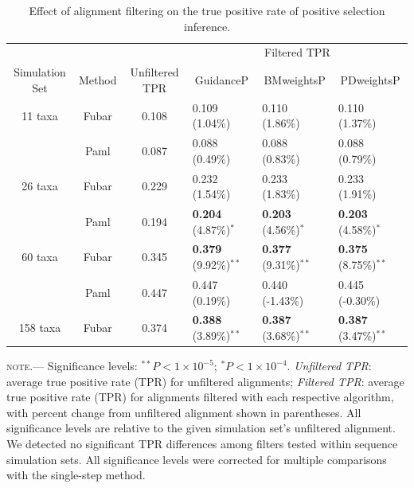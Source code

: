 \documentclass[10pt]{article}
\begin{document}
\begin{table}
\caption {\label{tab:casemodel} Effect of alignment filtering on the true positive rate of positive selection inference.}
\begin{tabular}{c c c l l l}
\hline\noalign{\smallskip}
& & & \multicolumn{3}{c}{Filtered TPR} \\
\cline{4-6}\noalign{\smallskip}
Simulation Set & Method & Unfiltered TPR & \multicolumn{1}{c}{GuidanceP} & \multicolumn{1}{c}{BMweightsP} & \multicolumn{1}{c}{PDweightsP} \\ 
\hline\noalign{\smallskip}
11 taxa  & Fubar & 0.108 & 0.109  (1.04\%)   & 0.110  (1.86\%)  & 0.110  (1.37\%)        \\
              & Paml &  0.087 & 0.088  (0.49\%) &  0.088  (0.83\%)   & 0.088  (0.79\%)        \\
\hline
26 taxa   & Fubar &  0.229 & 0.232 (1.54\%)  & 0.233 (1.83\%) & 0.233 (1.91\%)         \\
              & Paml & 0.194 & \textbf{0.204} (4.87\%)$^{\ast}$ & \textbf{0.203} (4.56\%)$^{\ast}$ & \textbf{0.203} (4.58\%)$^{\ast}$   \\
\hline
60 taxa  & Fubar & 0.345 & \textbf{0.379} (9.92\%)$^{\ast\ast}$ & \textbf{0.377} (9.31\%)$^{\ast\ast}$ & \textbf{0.375} (8.75\%)$^{\ast\ast}$  \\
              & Paml & 0.447 & 0.447 (0.19\%) & 0.440 (-1.43\%) & 0.445 (-0.30\%) \\
\hline
158 taxa & Fubar & 0.374 & \textbf{0.388} (3.89\%)$^{\ast\ast}$ & \textbf{0.387} (3.68\%)$^{\ast\ast}$ & \textbf{0.387} (3.47\%)$^{\ast\ast}$  \\
\hline
\end{tabular}
\newline
\textsc{note.}--- Significance levels: $^{\ast\ast} P < 1\times10^{-5}$; $^{\ast} P < 1\times10^{-4}$. \textit{Unfiltered TPR}: average true positive rate (TPR) for unfiltered alignments; \textit{Filtered TPR}: average true positive rate (TPR) for alignments filtered with each respective algorithm, with percent change from unfiltered alignment shown in parentheses. All significance levels are relative to the given simulation set's unfiltered alignment. We detected no significant TPR differences among filters tested within sequence simulation sets. All significance levels were corrected for multiple comparisons with the single-step method.
\end{table}




	
\end{document}
